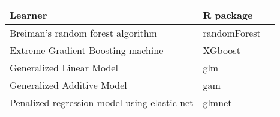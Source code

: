 \documentclass{article}
\begin{document}
\centering
\begin{tabular}{llr}
\toprule
Learner & R package \\
  \midrule
  Breiman's random forest algorithm             & randomForest \cite{randomforest} \\
  Extreme Gradient Boosting machine             & XGboost \cite{xgboost}\\
Generalized Linear Model                      & glm          \\
Generalized Additive Model                    & gam       \cite{gam}    \\
Penalized regression model using elastic net  & glmnet \cite{glmnet}      \\

  \bottomrule

\end{tabular}



\end{document}

